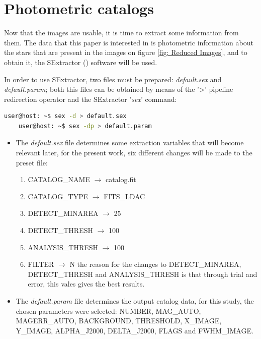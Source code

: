 \documentclass{aa}
\begin{document}
    \section{Photometric catalogs}\label{sec: Photometric catalogs}
    Now that the images are usable, it is time to extract some information from them. The data that this paper is interested in is photometric information about the stars that are present in the images on figure \ref{fig: Reduced Images}, and to obtain it, the SExtractor (\cite{SExtractor}) software will be used.

    In order to use SExtractor, two files must be prepared: \textit{default.sex} and \textit{default.param}; both this files can be obtained by means of the '>' pipeline redirection operator and the SExtractor '\textit{sex}' command: 
    \begin{lstlisting}[language=bash]
    user@host: ~$ sex -d > default.sex
    user@host: ~$ sex -dp > default.param
    \end{lstlisting}

    \begin{itemize}
        \item The \textit{default.sex} file determines some extraction variables that will become relevant later, for the present work, six different changes will be made to the preset file:
        \begin{enumerate}
            \item CATALOG\_NAME $\to$ catalog.fit
            \item CATALOG\_TYPE $\to$ FITS\_LDAC
            \item DETECT\_MINAREA $\to$ 25
            \item DETECT\_THRESH $\to$ 100
            \item ANALYSIS\_THRESH $\to$ 100
            \item FILTER $\to$ N
        the reason for the changes to DETECT\_MINAREA, DETECT\_THRESH and ANALYSIS\_THRESH is that through trial and error, this vales gives the best results.
        
        \end{enumerate}
        \item The \textit{default.param} file determines the output catalog data, for this study, the chosen parameters were selected: NUMBER, MAG\_AUTO, MAGERR\_AUTO, BACKGROUND, THRESHOLD, X\_IMAGE, Y\_IMAGE, ALPHA\_J2000, DELTA\_J2000, FLAGS and FWHM\_IMAGE. 
    \end{itemize}
\end{document}
